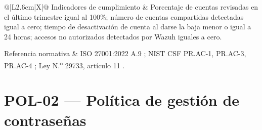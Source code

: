\documentclass[11pt, a4paper, oneside]{report}
\begin{document}
\begin{xltabular}{\textwidth}{@{}|L{2.6cm}|X|@{}}
{\small Indicadores de cumplimiento} & {\small Porcentaje de cuentas revisadas en el último trimestre igual al 100\%; número de cuentas compartidas detectadas igual a cero; tiempo de desactivación de cuenta al darse la baja menor o igual a 24 horas; accesos no autorizados detectados por Wazuh iguales a cero.} \\ \hline

{\small Referencia normativa} & {\small ISO 27001:2022 A.9 \citep{iso27001}; NIST CSF PR.AC-1, PR.AC-3, PR.AC-4 \citep{nistcsf}; Ley N.\textsuperscript{o} 29733, artículo 11 \citep{ley29733}.} \\ \hline

\end{xltabular}

\normalsize

\section{POL-02 — Política de gestión de contraseñas}

\renewcommand{\arraystretch}{1.3}
\footnotesize
{}
\end{document}

